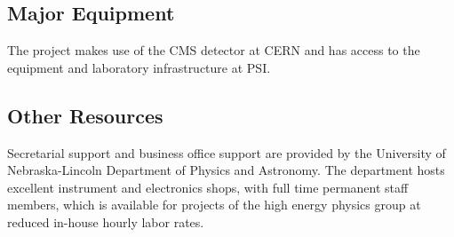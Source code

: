 \subsection{Major Equipment}
The project makes use of the CMS detector at CERN and has access to the equipment and laboratory infrastructure at PSI.

\subsection{Other Resources}
Secretarial support and business office support are provided by the
University of Nebraska-Lincoln Department of Physics and Astronomy. The
department hosts excellent instrument and electronics shops, with full time
permanent staff members, which is available for projects of the high energy
physics group at reduced in-house hourly labor rates.

